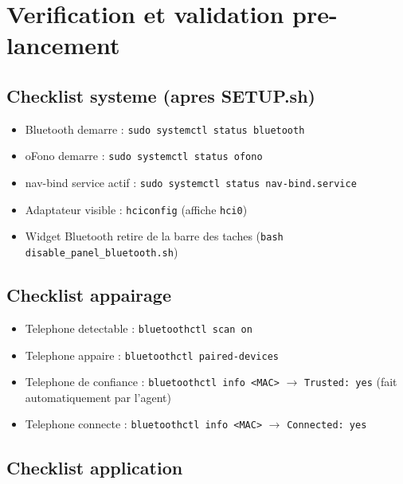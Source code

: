 \documentclass[a4paper,11pt]{article}
\begin{document}
\section{Verification et validation pre-lancement}

\subsection{Checklist systeme (apres SETUP.sh)}

\begin{itemize}
  \item[\checkmark] Bluetooth demarre : \texttt{sudo systemctl status bluetooth}
  \item[\checkmark] oFono demarre : \texttt{sudo systemctl status ofono}
  \item[\checkmark] nav-bind service actif : \texttt{sudo systemctl status nav-bind.service}
  \item[\checkmark] Adaptateur visible : \texttt{hciconfig} (affiche \texttt{hci0})
  \item[\checkmark] Widget Bluetooth retire de la barre des taches
    (\texttt{bash disable\_panel\_bluetooth.sh})
\end{itemize}

\subsection{Checklist appairage}

\begin{itemize}
  \item[\checkmark] Telephone detectable : \texttt{bluetoothctl scan on}
  \item[\checkmark] Telephone appaire : \texttt{bluetoothctl paired-devices}
  \item[\checkmark] Telephone de confiance : \texttt{bluetoothctl info <MAC>} $\to$ \texttt{Trusted: yes}
    (fait automatiquement par l'agent)
  \item[\checkmark] Telephone connecte : \texttt{bluetoothctl info <MAC>} $\to$ \texttt{Connected: yes}
\end{itemize}

\subsection{Checklist application}
\end{document}
